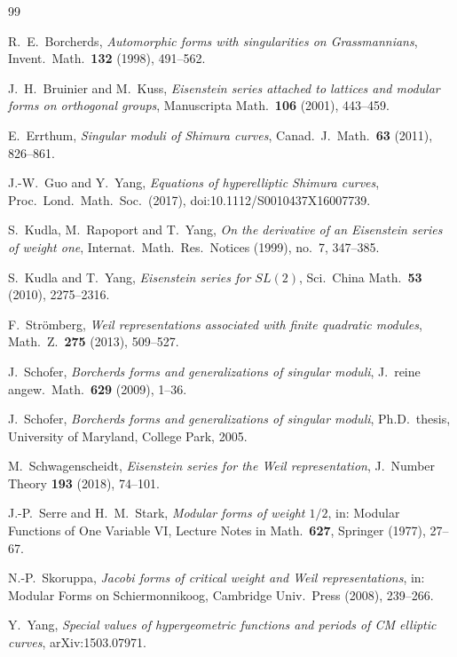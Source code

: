 \documentclass[11pt,reqno]{amsart}
\theoremstyle{plain}
\theoremstyle{definition}
\begin{document}
\begin{thebibliography}{99}

 R.~E.~Borcherds, \emph{Automorphic forms with singularities on Grassmannians},
Invent.\ Math.\ \textbf{132} (1998), 491--562.

 J.~H.~Bruinier and M.~Kuss, \emph{Eisenstein series attached to lattices and modular
forms on orthogonal groups}, Manuscripta Math.\ \textbf{106} (2001), 443--459.

 E.~Errthum, \emph{Singular moduli of Shimura curves},
Canad.\ J.\ Math.\ \textbf{63} (2011), 826--861.

 J.-W.~Guo and Y.~Yang, \emph{Equations of hyperelliptic Shimura curves},
Proc.\ Lond.\ Math.\ Soc.\ (2017), doi:10.1112/S0010437X16007739.

 S.~Kudla, M.~Rapoport and T.~Yang, \emph{On the derivative of an Eisenstein series of
weight one}, Internat.\ Math.\ Res.\ Notices (1999), no.~7, 347--385.

 S.~Kudla and T.~Yang, \emph{Eisenstein series for $SL(2)$},
Sci.\ China Math.\ \textbf{53} (2010), 2275--2316.

 F.~Str\"omberg, \emph{Weil representations associated with finite
quadratic modules}, Math.~Z.\ \textbf{275} (2013), 509--527.

 J.~Schofer, \emph{Borcherds forms and generalizations of singular moduli},
J.\ reine angew.\ Math.\ \textbf{629} (2009), 1--36.

 J.~Schofer, \emph{Borcherds forms and generalizations of singular moduli},
Ph.D.\ thesis, University of Maryland, College Park, 2005.

 M.~Schwagenscheidt, \emph{Eisenstein series for the Weil representation},
J.\ Number Theory \textbf{193} (2018), 74--101.

 J.-P.~Serre and H.~M.~Stark, \emph{Modular forms of weight $1/2$}, in: Modular
Functions of One Variable VI, Lecture Notes in Math.\ \textbf{627}, Springer (1977), 27--67.

 N.-P.~Skoruppa, \emph{Jacobi forms of critical weight and Weil
representations}, in: Modular Forms on Schiermonnikoog, Cambridge Univ.\ Press (2008), 239--266.

 Y.~Yang, \emph{Special values of hypergeometric functions and periods of CM elliptic
curves}, arXiv:1503.07971.

\end{thebibliography}
\end{document}
